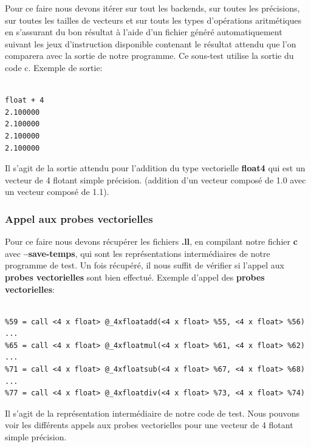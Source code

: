 \documentclass[11pt]{article}
\begin{document}
Pour ce faire nous devons itérer sur tout les backends, sur toutes les
précisions, sur toutes les tailles de vecteurs et sur touts les types
d'opérations aritmétiques en s'assurant du bon résultat à l'aide
d'un fichier généré automatiquement suivant les jeux d'instruction
disponible contenant le résultat attendu que l'on comparera avec
la sortie de notre programme.
\vspace{5mm}
Ce sous-test utilise la sortie du code c.
\vspace{5mm}
Exemple de sortie:
\vspace{5mm}
\begin{verbatim}

float + 4
2.100000
2.100000
2.100000
2.100000

\end{verbatim}
\vspace{5mm}
Il s'agit de la sortie attendu pour l'addition du type vectorielle \textbf{float4} qui
est un vecteur de 4 flotant simple précision. (addition d'un vecteur
composé de 1.0 avec un vecteur composé de 1.1).

\subsubsection{Appel aux probes vectorielles}
\label{sec:org4424d81}

Pour ce faire nous devons récupérer les fichiers \textbf{.ll}, en
compilant notre fichier \textbf{c} avec \textbf{--save-temps}, qui sont les
représentations intermédiaires de notre programme de test.
\vspace{5mm}
Un fois récupéré, il nous suffit de vérifier si l'appel aux
\textbf{probes vectorielles} sont bien effectué.
\vspace{5mm}
Exemple d'appel des \textbf{probes vectorielles}:
\vspace{5mm}
\begin{verbatim}

%59 = call <4 x float> @_4xfloatadd(<4 x float> %55, <4 x float> %56)
...
%65 = call <4 x float> @_4xfloatmul(<4 x float> %61, <4 x float> %62)
...
%71 = call <4 x float> @_4xfloatsub(<4 x float> %67, <4 x float> %68)
...
%77 = call <4 x float> @_4xfloatdiv(<4 x float> %73, <4 x float> %74)

\end{verbatim}
\vspace{5mm}
Il s'agit de la représentation intermédiaire de notre code de
test. Nous pouvons voir les différents appels aux probes
vectorielles pour une vecteur de 4 flotant simple précision.
\end{document}
